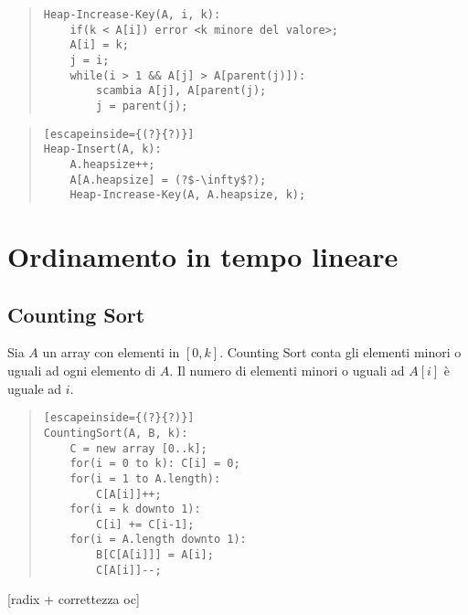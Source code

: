 \documentclass[a4paper,10pt]{article}
\theoremstyle{definition}
\begin{document}
\begin{quote}
 \begin{lstlisting}
Heap-Increase-Key(A, i, k):
    if(k < A[i]) error <k minore del valore>;
    A[i] = k;
    j = i;
    while(i > 1 && A[j] > A[parent(j)]):
        scambia A[j], A[parent(j);
        j = parent(j);
 \end{lstlisting}
\end{quote}
\begin{quote}
 \begin{lstlisting}[escapeinside={(?}{?)}]
Heap-Insert(A, k):
    A.heapsize++;
    A[A.heapsize] = (?$-\infty$?);
    Heap-Increase-Key(A, A.heapsize, k);
 \end{lstlisting}
\end{quote}
    
\section{Ordinamento in tempo lineare}    
\subsection{Counting Sort}
Sia $A$ un array con elementi in $[0, k]$. Counting Sort conta gli elementi minori o uguali ad ogni elemento di $A$. Il numero di elementi minori o uguali ad $A[i]$ è uguale ad $i$.

\begin{quote}
 \begin{lstlisting}[escapeinside={(?}{?)}]
CountingSort(A, B, k):
    C = new array [0..k];
    for(i = 0 to k): C[i] = 0;
    for(i = 1 to A.length):
        C[A[i]]++;
    for(i = k downto 1):
        C[i] += C[i-1];
    for(i = A.length downto 1):
        B[C[A[i]]] = A[i];
        C[A[i]]--;
 \end{lstlisting}
\end{quote}

[radix + correttezza oc]
    
\end{document}
